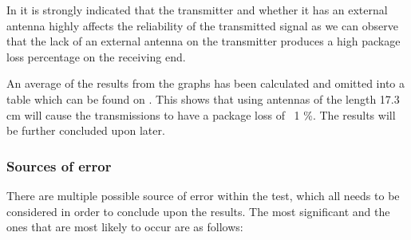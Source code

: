 \noindent%
In  it is strongly indicated that the transmitter and whether it has an external antenna highly affects the reliability of the transmitted signal as we can observe that the lack of an external antenna on the transmitter produces a high package loss percentage on the receiving end.

An average of the results from the graphs has been calculated and omitted into a table which can be found on . 
This shows that using antennas of the length 17.3 cm will cause the transmissions to have a package loss of ~1 \%.
The results will be further concluded upon later.

\subsubsection*{Sources of error}
There are multiple possible source of error within the test, which all needs to be considered in order to conclude upon the results.
The most significant and the ones that are most likely to occur are as follows:
